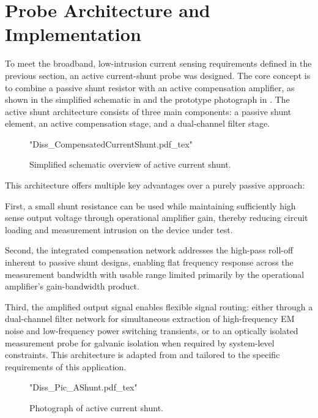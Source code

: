 
\section{Probe Architecture and Implementation}

To meet the broadband, low-intrusion current sensing requirements defined in the previous section, an active current-shunt probe was designed. 
The core concept is to combine a passive shunt resistor with an active compensation amplifier, as shown in the simplified schematic in  and the prototype photograph in .
The active shunt architecture consists of three main components: a passive shunt element, an active compensation stage, and a dual-channel filter stage.

\begin{figure}[htbp]
	\centering
	{"Diss_CompensatedCurrentShunt.pdf_tex"}
	\caption{Simplified schematic overview of active current shunt.}\label{fig:ESBActiveShunt}
\end{figure}

This architecture offers multiple key advantages over a purely passive approach:

First, a small shunt resistance can be used while maintaining sufficiently high sense output voltage through operational amplifier gain, thereby reducing circuit loading and measurement intrusion on the device under test.

Second, the integrated compensation network addresses the high-pass roll-off inherent to passive shunt designs, enabling flat frequency response across the measurement bandwidth with usable range limited primarily by the operational amplifier's gain-bandwidth product.

Third, the amplified output signal enables flexible signal routing: either through a dual-channel filter network for simultaneous extraction of high-frequency EM noise and low-frequency power switching transients, or to an optically isolated measurement probe for galvanic isolation when required by system-level constraints.
This architecture is adapted from \cite{shillaber_gigahertz_2020,shillaber_ultrafast_2022} and tailored to the specific requirements of this application.

\begin{figure}[ht]
	\centering
	{"Diss_Pic_AShunt.pdf_tex"}
	\caption{Photograph of active current shunt.}\label{fig:ESBActiveShuntPhoto}
\end{figure}


